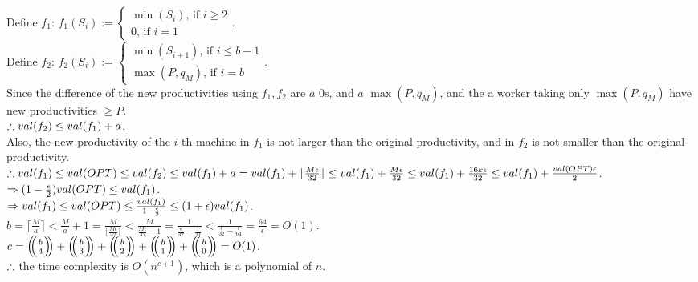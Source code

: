\begin{pr}
Define $f_1$: $f_1(S_i):=\begin{cases}
\min(S_i)\text{, if }i\geq2\\
0\text{, if }i=1
\end{cases}$.\\
Define $f_2$: $f_2(S_i):=\begin{cases}
\min(S_{i+1})\text{, if }i\leq b-1\\
\max(P, q_M)\text{, if }i=b
\end{cases}$.\\
Since the difference of the new productivities using $f_1, f_2$ are $a$ $0$s, and $a$ $\max(P, q_M)$, and the a worker taking only $\max(P, q_M)$ have new productivities $\geq P$.\\
$\therefore val(f_2)\leq val(f_1)+a$.\\
Also, the new productivity of the $i$-th machine in $f_1$ is not larger than the original productivity, and in $f_2$ is not smaller than the original productivity.\\
$\therefore val(f_1)\leq val(OPT)\leq val(f_2)\leq val(f_1)+a=val(f_1)+\lfloor\frac{M\epsilon}{32}\rfloor\leq val(f_1)+\frac{M\epsilon}{32}\leq val(f_1)+\frac{16k\epsilon}{32}\leq val(f_1)+\frac{val(OPT)\epsilon}2$.\\
$\Rightarrow(1-\frac\epsilon2)val(OPT)\leq val(f_1)$.\\
$\Rightarrow val(f_1)\leq val(OPT)\leq\frac{val(f_1)}{1-\frac\epsilon2}\leq(1+\epsilon)val(f_1)$.\\
$b=\lceil\frac Ma\rceil<\frac Ma+1=\frac M{\lfloor\frac{M\epsilon}{32}\rfloor}<\frac M{\frac{M\epsilon}{32}-1}=\frac1{\frac{\epsilon}{32}-\frac1M}<\frac1{\frac \epsilon{32}-\frac\epsilon{64}}=\frac{64}\epsilon=O(1)$.\\
$c=\bbinom b4+\bbinom b3+\bbinom b2+\bbinom b1+\bbinom b0=O(1)$.\\
$\therefore$ the time complexity is $O(n^{c+1})$, which is a polynomial of $n$.
\end{pr}
